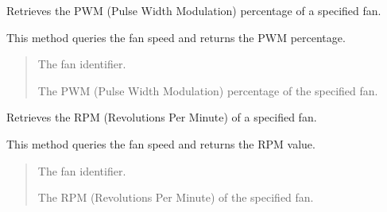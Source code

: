\documentclass[letterpaper,10pt,english]{sphinxmanual}
\begin{document}
\begin{fulllineitems}
\begin{fulllineitems}
\end{fulllineitems}


\begin{fulllineitems}
\label{\detokenize{apidocs:subrack_management_board.SubrackMngBoard.GetFanPwm}}
\pysigstartsignatures
{}
\pysigstopsignatures
\sphinxAtStartPar
Retrieves the PWM (Pulse Width Modulation) percentage of a specified fan.

\sphinxAtStartPar
This method queries the fan speed and returns the PWM percentage.
\begin{quote}\begin{description}
\sphinxAtStartPar
{} \textendash{} The fan identifier.

\sphinxAtStartPar
The PWM (Pulse Width Modulation) percentage of the specified fan.

\end{description}\end{quote}

\end{fulllineitems}


\begin{fulllineitems}
\label{\detokenize{apidocs:subrack_management_board.SubrackMngBoard.GetFanRpm}}
\pysigstartsignatures
{}
\pysigstopsignatures
\sphinxAtStartPar
Retrieves the RPM (Revolutions Per Minute) of a specified fan.

\sphinxAtStartPar
This method queries the fan speed and returns the RPM value.
\begin{quote}\begin{description}
\sphinxAtStartPar
{} \textendash{} The fan identifier.

\sphinxAtStartPar
The RPM (Revolutions Per Minute) of the specified fan.


\end{description}
\end{quote}
\end{fulllineitems}
\end{fulllineitems}
\end{document}
